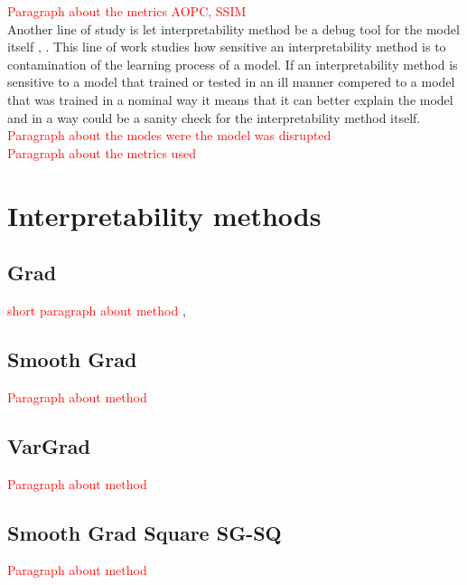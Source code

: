 \documentclass[12pt]{report}
\begin{document}
\textcolor{red}{Paragraph about the metrics AOPC, SSIM} \\

Another line of study is let interpretability method be a debug tool for the model itself \cite{https://doi.org/10.48550/arxiv.1810.03292}, \cite{DBLP:journals/corr/abs-2011-05429}. This line of work studies how sensitive an interpretability method is to contamination of the learning process of a model. If an interpretability method is sensitive to a model that trained or tested in an ill manner compered to a model that was trained in a nominal way it means that it can better explain the model and in a way could be a sanity check for the interpretability method itself.  \\

\textcolor{red}{Paragraph about the modes were the model was disrupted} \\

\textcolor{red}{Paragraph about the metrics used} \\





\newpage
\section{Interpretability methods}








\subsection{Grad }
	\textcolor{red}{short paragraph about method} \cite{baehrens2010explain}, \cite{https://doi.org/10.48550/arxiv.1312.6034}

\subsection{Smooth Grad}

	\textcolor{red}{Paragraph about method} \cite{DBLP:journals/corr/SmilkovTKVW17}

\subsection{VarGrad}

	\textcolor{red}{Paragraph about method} \ \cite{DBLP:journals/corr/abs-1810-03307}

\subsection{Smooth Grad Square SG-SQ}
		\textcolor{red}{Paragraph about method} \cite{https://doi.org/10.48550/arxiv.1806.10758}
\end{document}
